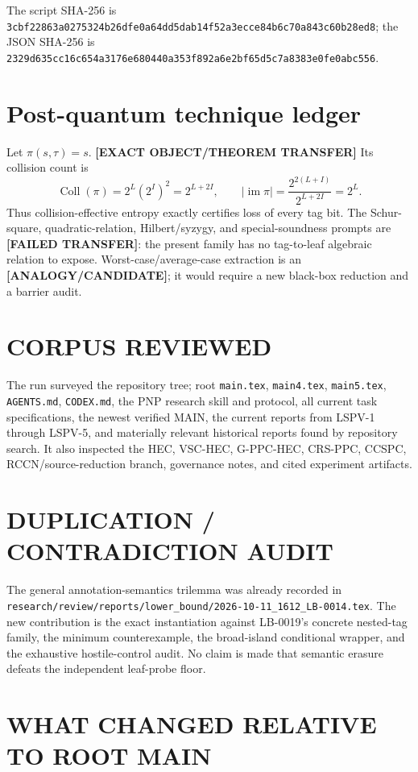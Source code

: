 \documentclass[11pt]{article}
\newcommand{\status}[1]{\textbf{[#1]}}
\begin{document}
The script SHA-256 is
\texttt{3cbf22863a0275324b26dfe0a64dd5dab14f52a3ecce84b6c70a843c60b28ed8};
the JSON SHA-256 is
\texttt{2329d635cc16c654a3176e680440a353f892a6e2bf65d5c7a8383e0fe0abc556}.

\section{Post-quantum technique ledger}

Let $\pi(s,\tau)=s$.  \status{EXACT OBJECT/THEOREM TRANSFER} Its collision
count is
\[
\operatorname{Coll}(\pi)=2^L(2^I)^2=2^{L+2I},
\qquad
|\operatorname{im}\pi|
=\frac{2^{2(L+I)}}{2^{L+2I}}=2^L .
\]
Thus collision-effective entropy exactly certifies loss of every tag bit.
The Schur-square, quadratic-relation, Hilbert/syzygy, and special-soundness
prompts are \status{FAILED TRANSFER}: the present family has no
tag-to-leaf algebraic relation to expose.  Worst-case/average-case
extraction is an \status{ANALOGY/CANDIDATE}; it would require a new
black-box reduction and a barrier audit.

\section{CORPUS REVIEWED}

The run surveyed the repository tree; root \texttt{main.tex},
\texttt{main4.tex}, \texttt{main5.tex}, \texttt{AGENTS.md},
\texttt{CODEX.md}, the PNP research skill and protocol, all current task
specifications, the newest verified MAIN, the current reports from
LSPV-1 through LSPV-5, and materially relevant historical reports found by
repository search.  It also inspected the HEC, VSC-HEC, G-PPC-HEC,
CRS-PPC, CCSPC, RCCN/source-reduction branch, governance notes, and cited
experiment artifacts.

\section{DUPLICATION / CONTRADICTION AUDIT}

The general annotation-semantics trilemma was already recorded in
\texttt{research/review/reports/lower\_bound/2026-10-11\_1612\_LB-0014.tex}.
The new contribution is the exact instantiation against LB-0019's concrete
nested-tag family, the minimum counterexample, the broad-island conditional
wrapper, and the exhaustive hostile-control audit.  No claim is made that
semantic erasure defeats the independent leaf-probe floor.

\section{WHAT CHANGED RELATIVE TO ROOT MAIN}
\end{document}

